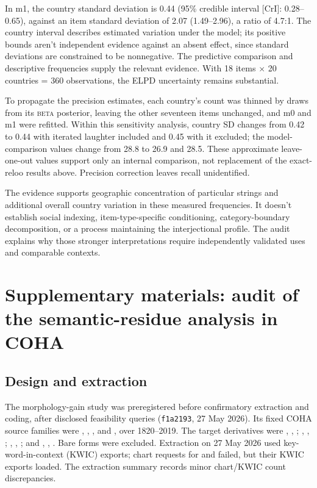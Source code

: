 \documentclass[12pt]{article}
\begin{document}
In m1, the country standard deviation is 0.44 (95\% credible interval [CrI]: 0.28--0.65), against an item standard deviation of 2.07 (1.49--2.96), a ratio of 4.7:1. The country interval describes estimated variation under the model; its positive bounds aren't independent evidence against an absent effect, since standard deviations are constrained to be nonnegative. The predictive comparison and descriptive frequencies supply the relevant evidence. With 18 items $\times$ 20 countries = 360 observations, the ELPD uncertainty remains substantial.

To propagate the  precision estimates, each country's count was thinned by draws from its \textsc{beta} posterior, leaving the other seventeen items unchanged, and m0 and m1 were refitted. Within this sensitivity analysis, country SD changes from 0.42 to 0.44 with iterated laughter included and 0.45 with it excluded; the model-comparison values change from 28.8 to 26.9 and 28.5. These approximate leave-one-out values support only an internal comparison, not replacement of the exact-reloo results above. Precision correction leaves recall unidentified.

The evidence supports geographic concentration of particular strings and additional overall country variation in these measured frequencies. It doesn't establish social indexing, item-type-specific conditioning, category-boundary decomposition, or a process maintaining the interjectional profile. The audit explains why those stronger interpretations require independently validated uses and comparable contexts.

\clearpage

\section[Semantic residue in COHA]{Supplementary materials: audit of the semantic-residue analysis in COHA}
\label{app:morphgain}

\subsection{Design and extraction}

The morphology-gain study was preregistered before confirmatory extraction and coding, after disclosed feasibility queries (\texttt{f1a2193}, 27 May 2026). Its fixed COHA source families were , , , and , over 1820--2019. The target derivatives were , , ; , , ; , , ; and , , . Bare forms were excluded. Extraction on 27 May 2026 used key-word-in-context (KWIC) exports; chart requests for  and  failed, but their KWIC exports loaded. The extraction summary records minor chart/KWIC count discrepancies.
\end{document}

